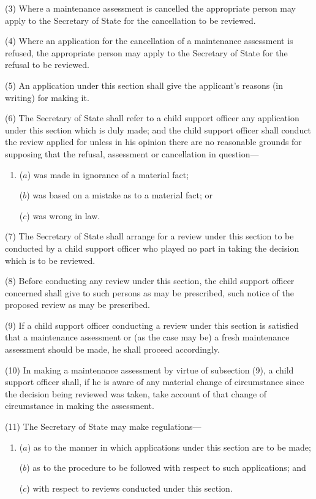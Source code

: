 \documentclass[12pt,a4paper]{article}
\begin{document}
(3) Where a maintenance assessment is cancelled the appropriate person may apply to the Secretary of State for the cancellation to be reviewed.

(4) Where an application for the cancellation of a maintenance assessment is refused, the appropriate person may apply to the Secretary of State for the refusal to be reviewed.

(5) An application under this section shall give the applicant’s reasons (in writing) for making it.

(6) The Secretary of State shall refer to a child support officer any application under this section which is duly made; and the child support officer shall conduct the review applied for unless in his opinion there are no reasonable grounds for supposing that the refusal, assessment or cancellation in question—
\begin{enumerate}\item[]
($a$) was made in ignorance of a material fact;

($b$) was based on a mistake as to a material fact;
or  %

($c$) was wrong in law.
\end{enumerate}

(7) The Secretary of State shall arrange for a review under this section to be conducted by a child support officer who played no part in taking the decision which is to be reviewed.

(8) Before conducting any review under this section, the child support officer concerned shall give to such persons as may be prescribed, such notice of the proposed review as may be prescribed.

(9) If a child support officer conducting a review under this section is satisfied that a maintenance assessment or (as the case may be) a fresh maintenance assessment should be made, he shall proceed accordingly.

(10) In making a maintenance assessment by virtue of subsection (9), a child support officer shall, if he is aware of any material change of circumstance since the decision being reviewed was taken, take account of that change of circumstance in making the assessment.

(11) The Secretary of State may make regulations—
\begin{enumerate}\item[]
($a$) as to the manner in which applications under this section are to be made;

($b$) as to the procedure to be followed with respect to such applications; and

($c$) with respect to reviews conducted under this section.
\end{enumerate}
\end{document}
